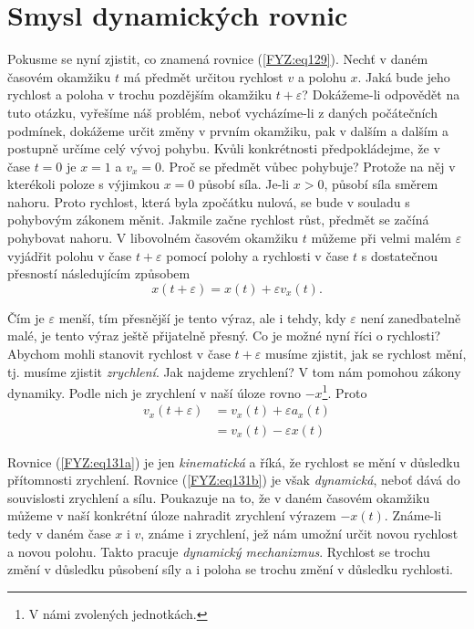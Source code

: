   \section{Smysl dynamických rovnic}
    Pokusme se nyní zjistit, co znamená rovnice (\ref{FYZ:eq129}). Nechť v daném časovém okamžiku 
    \(t\) má předmět určitou rychlost \(v\) a polohu \(x\). Jaká bude jeho rychlost a poloha v 
    trochu pozdějším okamžiku \(t+\varepsilon\)? Dokážeme-li odpovědět na tuto otázku, vyřešíme náš 
    problém, neboť vycházíme-li z daných počátečních podmínek, dokážeme určit změny v prvním 
    okamžiku, pak v dalším a dalším a postupně určíme celý vývoj pohybu. Kvůli konkrétnosti 
    předpokládejme, že v čase \(t = 0\) je \(x= 1\) a \(v_x = 0\). Proč se předmět vůbec pohybuje? 
    Protože na něj v kterékoli poloze s výjimkou \(x=0\) působí síla. Je-li \(x > 0\), působí síla 
    směrem nahoru. Proto rychlost, která byla zpočátku nulová, se bude v souladu s pohybovým 
    zákonem měnit. Jakmile začne rychlost růst, předmět se začíná pohybovat nahoru. V libovolném 
    časovém okamžiku \(t\) můžeme při velmi malém \(\varepsilon\) vyjádřit polohu v čase \(t + 
    \varepsilon\) pomocí polohy a rychlosti v čase \(t\) s dostatečnou přesností následujícím 
    způsobem
    \begin{equation}\label{FYZ:eq130}
      x(t+\varepsilon) = x(t) + \varepsilon v_x(t).
    \end{equation}
    
    Čím je \(\varepsilon\) menší, tím přesnější je tento výraz, ale i tehdy, kdy \(\varepsilon\) 
    není zanedbatelně malé, je tento výraz ještě přijatelně přesný. Co je možné nyní říci o 
    rychlosti? Abychom mohli stanovit rychlost v čase \(t + \varepsilon\) musíme zjistit, jak se 
    rychlost mění, tj. musíme zjistit \emph{zrychlení}. Jak najdeme zrychlení? V tom nám pomohou 
    zákony dynamiky. Podle nich je zrychlení v naší úloze rovno \(-x\)\footnote{V námi zvolených 
    jednotkách.}. Proto
    \begin{subequations}
      \label{FYZ:eq131} 
      \begin{align}
        v_x(t+\varepsilon) &= v_x(t) + \varepsilon a_x(t)  \label{FYZ:eq131a}        \\
                           &= v_x(t) - \varepsilon x(t)    \label{FYZ:eq131b}
      \end{align}
    \end{subequations} 
    
    Rovnice (\ref{FYZ:eq131a}) je jen \emph{kinematická} a říká, že rychlost se mění v důsledku 
    přítomnosti zrychlení. Rovnice (\ref{FYZ:eq131b}) je však \emph{dynamická}, neboť dává do 
    souvislosti zrychlení a sílu. Poukazuje na to, že v daném časovém okamžiku můžeme v naší 
    konkrétní úloze nahradit zrychlení výrazem \(-x(t)\). Známe-li tedy v daném čase \(x\) i \(v\), 
    známe i zrychlení, jež nám umožní určit novou rychlost a novou polohu. Takto pracuje 
    \emph{dynamický mechanizmus}. Rychlost se trochu změní v důsledku působení síly a i poloha se 
    trochu změní v důsledku rychlosti.
     

